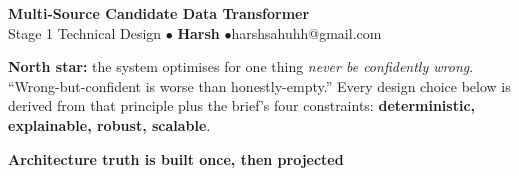 \documentclass[10pt]{article}
\begin{document}
{\color{accent}\LARGE\bfseries Multi-Source Candidate Data Transformer}\\[2pt]
{\color{muted}\footnotesize Stage 1 \textemdash{} Technical Design \quad$\bullet$\quad
\textbf{Harsh} \quad$\bullet$\quad harshsahuhh@gmail.com}

\vspace{3pt}
\colorbox{band}{\parbox{\dimexpr\textwidth-2\fboxsep}{\footnotesize
\textbf{North star:} the system optimises for one thing \textemdash{}
\emph{never be confidently wrong}. ``Wrong-but-confident is worse than
honestly-empty.'' Every design choice below is derived from that principle plus
the brief's four constraints: \textbf{deterministic, explainable, robust, scalable}.
}}

\vspace{4pt}

{\color{accent}\small\bfseries Architecture \textemdash{} truth is built once, then projected}
\end{document}
